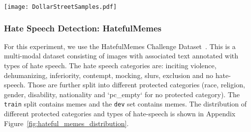\documentclass[10pt,twocolumn,letterpaper]{article}
\newcommand{\ImNet}{ImageNet-1K\xspace}
\newcommand{\dollarstreet}{DollarStreet\xspace}
\newcommand{\hateful}{HatefulMemes\xspace}
\newcommand{\seer}{SEER\xspace}
\begin{document}
\begin{figure*}[t]
  \centering
  \texttt{[image: DollarStreetSamples.pdf]}
  \caption{
    \textbf{Qualitative analysis of Geographical fairness} on \dollarstreet dataset as described in Sec.~\ref{sec:geo_fairness_dollar_street}. For a fixed architecture, here RG-128Gf, we show a few example images of improvement where our \seer model outperforms self-supervised and supervised pre-training on \ImNet. The examples are from various households of varying income levels and regions of the world. See supplemental material for license information.
  }
  \label{fig:dollar_street_samples} \end{figure*}





\subsubsection{Hate Speech Detection: \hateful}
\label{sec:hateful_memes_section}

For this experiment, we use the \hateful Challenge Dataset~\cite{kiela2021hateful}.
This is a multi-modal dataset consisting of  images with associated text annotated with types of hate speech.
The hate speech categories are: inciting violence, dehumanizing, inferiority, contempt, mocking, slurs, exclusion and no hate-speech.
Those are further split into different protected categories (race, religion, gender, disability, nationality and `pc\_empty` for no protected category). 
The \texttt{train} split contains  memes and the \texttt{dev} set contains  memes. 
The distribution of different protected categories and types of hate-speech is shown in Appendix Figure~\ref{fig:hateful_memes_distribution}.
\end{document}
